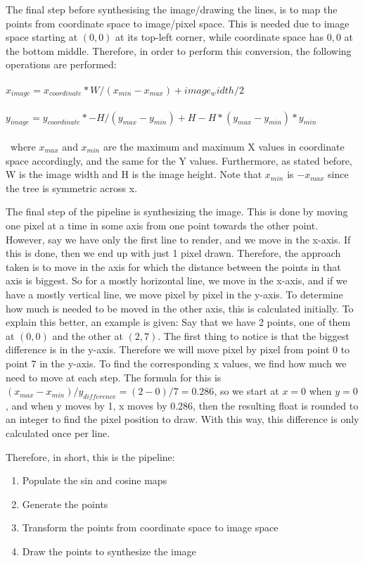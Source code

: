 The final step before synthesising the image/drawing the lines, is to map the points from coordinate space to image/pixel space. This is needed due to image space starting at $(0, 0)$ at its top-left corner, while coordinate space has $0,0$ at the bottom middle. Therefore, in order to perform this conversion, the following operations are performed: 
\\ \\
$x_{image} = x_{coordinate} * W / (x_{min} - x_{max}) + image_width/2$
\\ \\
$y_{image} = y_{coordinate} * - H / (y_{max} - y_{min}) + H - H*(y_{max}-y_{min}) * y_{min}$
\\ \\\
where $x_{max}$ and $x_{min}$ are the maximum and maximum X values in coordinate space accordingly, and the same for the Y values. Furthermore, as stated before, W is the image width and H is the image height. Note that $x_{min}$ is $-x_{max}$ since the tree is symmetric across x.

The final step of the pipeline is synthesizing the image. This is done by moving one pixel at a time in some axis from one point towards the other point. However, say we have only the first line to render, and we move in the x-axis. If this is done, then we end up with just 1 pixel drawn. Therefore, the approach taken is to move in the axis for which the distance between the points in that axis is biggest. So for a mostly horizontal line, we move in the x-axis, and if we have a mostly vertical line, we move pixel by pixel in the y-axis. To determine how much is needed to be moved in the other axis, this is calculated initially. To explain this better, an example is given: Say that we have 2 points, one of them at $(0, 0)$ and the other at $(2, 7)$. The first thing to notice is that the biggest difference is in the y-axis. Therefore we will move pixel by pixel from point 0 to point 7 in the y-axis. To find the corresponding x values, we find how much we need to move at each step. The formula for this is $(x_{max}-x_{min})/y_{difference} = (2-0)/7 = 0.286$, so we start at $x=0$ when $y=0$, and when y moves by 1, x moves by 0.286, then the resulting float is rounded to an integer to find the pixel position to draw. With this way, this difference is only calculated once per line.

Therefore, in short, this is the pipeline:
\begin{enumerate}
	\item Populate the sin and cosine maps
	\item Generate the points
	\item Transform the points from coordinate space to image space
	\item Draw the points to synthesize the image
\end{enumerate}
